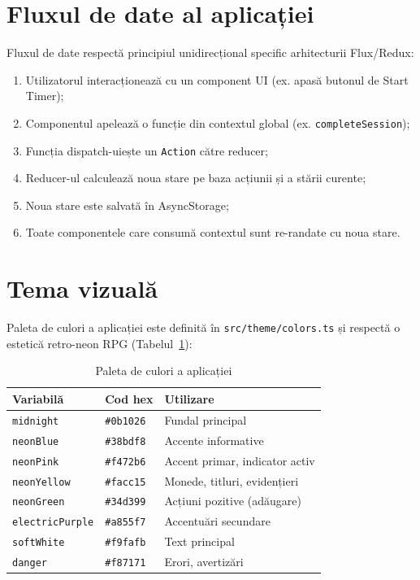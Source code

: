 \documentclass[12pt, a4paper, twoside]{report}
\numberwithin{equation}{section}
\begin{document}
\section{Fluxul de date al aplicației}

Fluxul de date respectă principiul unidirecțional specific arhitecturii Flux/Redux:

\begin{enumerate}
  \item Utilizatorul interacționează cu un component UI (ex. apasă butonul de Start Timer);
  \item Componentul apelează o funcție din contextul global (ex. \texttt{completeSession});
  \item Funcția dispatch-uiește un \texttt{Action} către reducer;
  \item Reducer-ul calculează noua stare pe baza acțiunii și a stării curente;
  \item Noua stare este salvată în AsyncStorage;
  \item Toate componentele care consumă contextul sunt re-randate cu noua stare.
\end{enumerate}

\section{Tema vizuală}

Paleta de culori a aplicației este definită în \texttt{src/theme/colors.ts} și respectă
o estetică retro-neon RPG (Tabelul~\ref{tab:colors}):

\begin{table}[H]
\centering
\caption{Paleta de culori a aplicației}
\label{tab:colors}
\begin{tabular}{lll}
\toprule
\textbf{Variabilă} & \textbf{Cod hex} & \textbf{Utilizare} \\
\midrule
\texttt{midnight} & \texttt{\#0b1026} & Fundal principal \\
\texttt{neonBlue} & \texttt{\#38bdf8} & Accente informative \\
\texttt{neonPink} & \texttt{\#f472b6} & Accent primar, indicator activ \\
\texttt{neonYellow} & \texttt{\#facc15} & Monede, titluri, evidențieri \\
\texttt{neonGreen} & \texttt{\#34d399} & Acțiuni pozitive (adăugare) \\
\texttt{electricPurple} & \texttt{\#a855f7} & Accentuări secundare \\
\texttt{softWhite} & \texttt{\#f9fafb} & Text principal \\
\texttt{danger} & \texttt{\#f87171} & Erori, avertizări \\
\bottomrule
\end{tabular}
\end{table}
\end{document}
